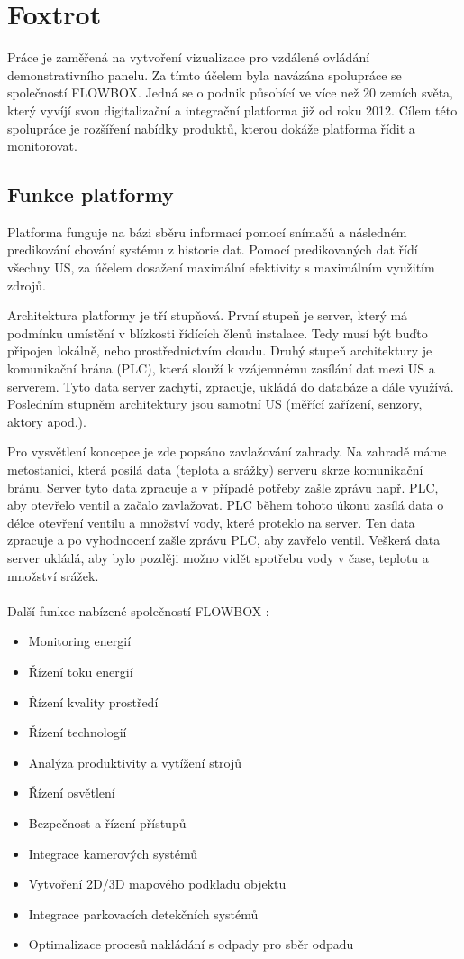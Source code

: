 \chapter{Foxtrot}
Práce je zaměřená na vytvoření vizualizace pro vzdálené ovládání demonstrativního panelu. Za tímto účelem byla navázána spolupráce se společností FLOWBOX. Jedná se o podnik působící ve více než 20 zemích světa, který vyvíjí svou digitalizační a integrační platforma již od roku 2012. Cílem této spolupráce je rozšíření nabídky produktů, kterou dokáže platforma řídit a monitorovat. \cite{FLOWBOX}

\section{Funkce platformy}
Platforma funguje na bázi sběru informací pomocí snímačů a následném predikování chování systému z historie dat. Pomocí predikovaných dat řídí všechny US, za účelem dosažení maximální efektivity s maximálním využitím zdrojů.

Architektura platformy je tří stupňová. První stupeň je server, který má podmínku umístění v blízkosti řídících členů instalace. Tedy musí být buďto připojen lokálně, nebo prostřednictvím cloudu. Druhý stupeň architektury je komunikační brána (PLC), která slouží k vzájemnému zasílání dat mezi US a serverem. Tyto data server zachytí, zpracuje, ukládá do databáze a dále využívá. Posledním stupněm architektury jsou samotní US (měřící zařízení, senzory, aktory apod.). \cite{FLOWBOX}

Pro vysvětlení koncepce je zde popsáno zavlažování zahrady. Na zahradě máme metostanici, která posílá data (teplota a srážky) serveru skrze komunikační bránu. Server tyto data zpracuje a v případě potřeby zašle zprávu např. PLC, aby otevřelo ventil a začalo zavlažovat. PLC během tohoto úkonu zasílá data o délce otevření ventilu a množství vody, které proteklo na server. Ten data zpracuje a po vyhodnocení zašle zprávu PLC, aby zavřelo ventil. Veškerá data server ukládá, aby bylo později možno vidět spotřebu vody v čase, teplotu a množství srážek.\cite{MITRENGA}
\\\\Další funkce nabízené společností FLOWBOX \cite{FLOWBOX}:
\begin{itemize}
    \item Monitoring energií
    \item Řízení toku energií
    \item Řízení kvality prostředí
    \item Řízení technologií
    \item Analýza produktivity a vytížení strojů
    \item Řízení osvětlení
    \item Bezpečnost a řízení přístupů
    \item Integrace kamerových systémů
    \item Vytvoření 2D/3D mapového podkladu objektu
    \item Integrace parkovacích detekčních systémů
    \item Optimalizace procesů nakládání s odpady pro sběr odpadu
\end{itemize}